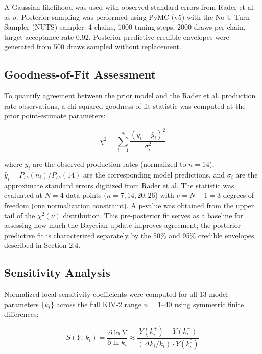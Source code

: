\documentclass[12pt,letterpaper]{article}
\begin{document}
A Gaussian likelihood was used with observed standard errors from Rader et al. as $\sigma$. Posterior sampling was performed using PyMC (v5)\citep{pymc2023} with the No-U-Turn Sampler (NUTS)\citep{hoffman2014no} sampler: 4 chains, 1000 tuning steps, 2000 draws per chain, target acceptance rate 0.92. Posterior predictive credible envelopes were generated from 500 draws sampled without replacement.

\subsection{Goodness-of-Fit Assessment}

To quantify agreement between the prior model and the Rader et al. \citep{rader1994inverse} production rate observations, a chi-squared goodness-of-fit statistic was computed at the prior point-estimate parameters:

\begin{equation} \label{eq:18}
    \chi^2 = \sum_{i=1}^{N} \frac{(y_i - \hat{y}_i)^2}{\sigma_i^2}
\end{equation}

where $y_i$ are the observed production rates (normalized to $n = 14$), $\hat{y}_i = P_{ss}(n_i) / P_{ss}(14)$ are the corresponding model predictions, and $\sigma_i$ are the approximate standard errors digitized from Rader et al. The statistic was evaluated at $N = 4$ data points ($n = 7, 14, 20, 26$) with $\nu = N - 1 = 3$ degrees of freedom (one normalization constraint). A p-value was obtained from the upper tail of the $\chi^2(\nu)$ distribution. This pre-posterior fit serves as a baseline for assessing how much the Bayesian update improves agreement; the posterior predictive fit is characterized separately by the 50\% and 95\% credible envelopes described in Section 2.4.


\subsection{Sensitivity Analysis}

Normalized local sensitivity coefficients were computed for all 13 model parameters $\{k_i\}$ across the full KIV-2 range $n = 1$--$40$ using symmetric finite differences:

\begin{equation} \label{eq:19}
    S(Y;\, k_i) = \frac{\partial \ln Y}{\partial \ln k_i} \approx \frac{Y(k_i^+) - Y(k_i^-)}{(\Delta k_i / k_i) \cdot Y(k_i^0)}
\end{equation}
\end{document}

